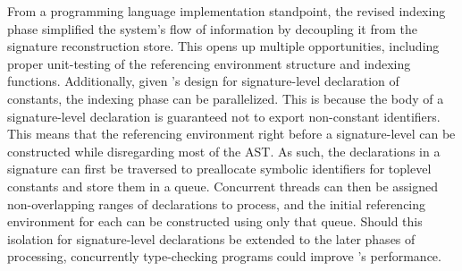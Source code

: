 From a programming language implementation standpoint, the revised indexing phase simplified the system's flow of information by decoupling it from the signature reconstruction store.
This opens up multiple opportunities, including proper unit-testing of the referencing environment structure and indexing functions.
Additionally, given \Beluga's design for signature-level declaration of constants, the indexing phase can be parallelized.
This is because the body of a signature-level declaration is guaranteed not to export non-constant identifiers.
This means that the referencing environment right before a signature-level can be constructed while disregarding most of the \ac{AST}.
As such, the declarations in a signature can first be traversed to preallocate symbolic identifiers for toplevel constants and store them in a queue.
Concurrent threads can then be assigned non-overlapping ranges of declarations to process, and the initial referencing environment for each can be constructed using only that queue.
Should this isolation for signature-level declarations be extended to the later phases of processing, concurrently type-checking programs could improve \Beluga's performance.
